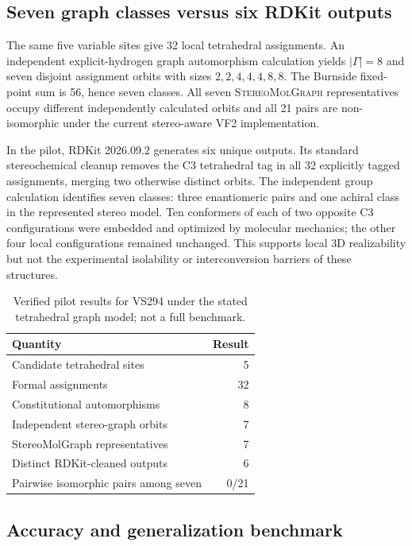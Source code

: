 \documentclass[journal=jcisd8,manuscript=article]{achemso}
\newcommand{\StereoMolGraph}{\textsc{StereoMolGraph}}
\begin{document}
\subsection{Seven graph classes versus six RDKit outputs}

The same five variable sites give 32 local tetrahedral assignments.
An independent explicit-hydrogen graph automorphism calculation yields
$|\Gamma|=8$ and seven disjoint assignment orbits with sizes
$2,2,4,4,4,8,8$. The Burnside fixed-point sum is 56, hence seven
classes. All seven \StereoMolGraph{} representatives occupy different
independently calculated orbits and all 21 pairs are non-isomorphic
under the current stereo-aware VF2 implementation.

In the pilot, RDKit 2026.09.2 generates six unique outputs.
Its standard stereochemical cleanup removes the C3 tetrahedral
tag in all 32 explicitly tagged assignments, merging
two otherwise distinct orbits. The independent group
calculation identifies seven classes: three enantiomeric
pairs and one achiral class in the represented stereo model.
Ten conformers of each of two opposite C3 configurations
were embedded and optimized by molecular mechanics; the
other four local configurations remained unchanged.
This supports local 3D realizability but not the
experimental isolability or interconversion barriers
of these structures.\cite{RDKit2026,Riniker2015,Wang2020,Halgren1996}

\begin{table}[ht]
\centering
\caption{Verified pilot results for VS294 under the stated
 tetrahedral graph model; not a full benchmark.}
\label{tab:vs294}
\begin{tabular}{@{}lr@{}}
\toprule
Quantity & Result \\
\midrule
Candidate tetrahedral sites & 5 \\
Formal assignments & 32 \\
Constitutional automorphisms & 8 \\
Independent stereo-graph orbits & 7 \\
StereoMolGraph representatives & 7 \\
Distinct RDKit-cleaned outputs & 6 \\
Pairwise isomorphic pairs among seven & 0/21 \\
\bottomrule
\end{tabular}
\end{table}

\subsection{Accuracy and generalization benchmark}
\end{document}
